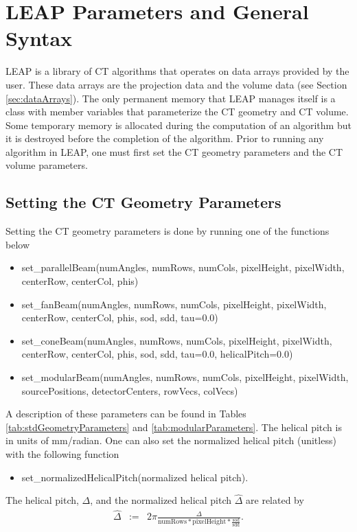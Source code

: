 \documentclass[11pt]{article}
\begin{document}
\section{LEAP Parameters and General Syntax}

LEAP is a library of CT algorithms that operates on data arrays provided by the user.  These data arrays are the projection data and the volume data (see Section \ref{sec:dataArrays}).  The only permanent memory that LEAP manages itself is a class with member variables that parameterize the CT geometry and CT volume.  Some temporary memory is allocated during the computation of an algorithm but it is destroyed before the completion of the algorithm.  Prior to running any algorithm in LEAP, one must first set the CT geometry parameters and the CT volume parameters.

\subsection{Setting the CT Geometry Parameters}

Setting the CT geometry parameters is done by running one of the functions below
\begin{itemize}
\item[] set\_parallelBeam(numAngles, numRows, numCols, pixelHeight, pixelWidth, centerRow, centerCol, phis)
\item[] set\_fanBeam(numAngles, numRows, numCols, pixelHeight, pixelWidth, centerRow, centerCol, phis, sod, sdd, tau=0.0)
\item[] set\_coneBeam(numAngles, numRows, numCols, pixelHeight, pixelWidth, centerRow, centerCol, phis, sod, sdd, tau=0.0, helicalPitch=0.0)
\item[] set\_modularBeam(numAngles, numRows, numCols, pixelHeight, pixelWidth, sourcePositions, detectorCenters, rowVecs, colVecs)
\end{itemize}
A description of these parameters can be found in Tables \ref{tab:stdGeometryParameters} and \ref{tab:modularParameters}.  The helical pitch is in units of mm/radian.  One can also set the normalized helical pitch (unitless) with the following function
\begin{itemize}
    \item[] set\_normalizedHelicalPitch(normalized helical pitch).
\end{itemize}
The helical pitch, $\Delta$, and the normalized helical pitch $\widehat{\Delta}$ are related by
\begin{eqnarray*}
\widehat{\Delta} &:=& 2\pi \frac{\Delta}{\text{numRows} * \text{pixelHeight} * \frac{\text{sod}}{\text{sdd}}}.
\end{eqnarray*}
\end{document}
